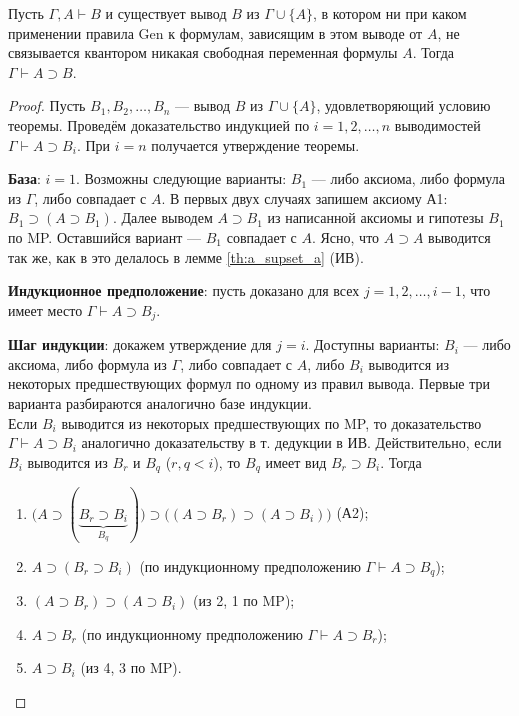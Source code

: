 \begin{theorem}
    Пусть $\Gamma, A \vdash B$ и существует вывод $B$ из $\Gamma \cup \{A\}$, в котором ни при каком применении правила Gen к формулам, зависящим в этом выводе от $A$, не связывается квантором никакая свободная переменная формулы $A$. Тогда $\Gamma \vdash A \supset B$.
\end{theorem}
\begin{proof}
    Пусть $B_1, B_2, \dots, B_n$ --- вывод $B$ из $\Gamma \cup \{A\}$, удовлетворяющий условию теоремы. Проведём доказательство индукцией по $i = 1, 2, \dots, n$ выводимостей $\Gamma \vdash A \supset B_i$. При $i = n$ получается утверждение теоремы.

    \textbf{База}: $i = 1$. Возможны следующие варианты: $B_1$ --- либо аксиома, либо формула из $\Gamma$, либо совпадает с $A$. В первых двух случаях запишем аксиому А1: $B_1 \supset (A \supset B_1)$. Далее выводем $A \supset B_1$ из написанной аксиомы и гипотезы $B_1$ по MP. Оставшийся вариант --- $B_1$ совпадает с $A$. Ясно, что $A \supset A$ выводится так же, как в это делалось в лемме \ref{th:a_supset_a} (ИВ).

    \textbf{Индукционное предположение}: пусть доказано для всех $j = 1, 2, \dots, i - 1$, что имеет место $\Gamma \vdash A \supset B_j$.

    \textbf{Шаг индукции}: докажем утверждение для $j = i$. Доступны варианты: $B_i$ --- либо аксиома, либо формула из $\Gamma$, либо совпадает с $A$, либо $B_i$ выводится из некоторых предшествующих формул по одному из правил вывода. Первые три варианта разбираются аналогично базе индукции. \\
    Если $B_i$ выводится из некоторых предшествующих по MP, то доказательство $\Gamma \vdash A \supset B_i$ аналогично доказательству в т. дедукции в ИВ. Действительно, если $B_i$ выводится из $B_r$ и $B_q$ ($r, q < i$), то $B_q$ имеет вид $B_r \supset B_i$. Тогда 
    \begin{enumerate}
        \item $\big(A \supset (\underbrace{B_r \supset B_i}_{B_q})\big) \supset \big((A \supset B_r) \supset (A \supset B_i)\big)$ (А2);
        \item $A \supset (B_r \supset B_i)$ (по индукционному предположению $\Gamma \vdash A \supset B_q$);
        \item $(A \supset B_r) \supset (A \supset B_i)$ (из 2, 1 по MP);
        \item $A \supset B_r$ (по индукционному предположению $\Gamma \vdash A \supset B_r$);
        \item $A \supset B_i$ (из 4, 3 по MP).
    \end{enumerate}


\end{proof}
